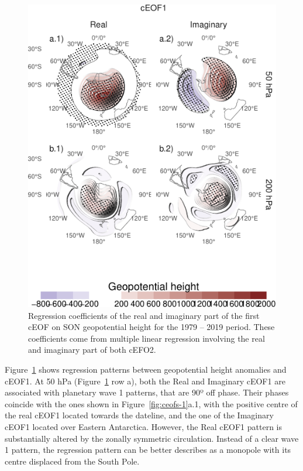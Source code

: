 \documentclass[smallextended]{svjour3}       %
\begin{document}
\begin{figure}
\centering
\includegraphics{../figures/eof1-regr-gh-1.pdf}
\caption{\label{fig:eof1-regr-gh}Regression coefficients of the real and imaginary part of the first cEOF on SON geopotential height for the 1979 -- 2019 period. These coefficients come from multiple linear regression involving the real and imaginary part of both cEFO2.}
\end{figure}

Figure~\ref{fig:eof1-regr-gh} shows regression patterns between geopotential height anomalies and cEOF1. At 50 hPa (Figure~\ref{fig:eof1-regr-gh} row a), both the Real and Imaginary cEOF1 are associated with planetary wave 1 patterns, that are 90º off phase. Their phases coincide with the ones shown in Figure~\ref{fig:ceofs-1}a.1, with the positive centre of the real cEOF1 located towards the dateline, and the one of the Imaginary cEOF1 located over Eastern Antarctica. However, the Real cEOF1 pattern is substantially altered by the zonally symmetric circulation. Instead of a clear wave 1 pattern, the regression pattern can be better describes as a monopole with its centre displaced from the South Pole.
\end{document}
